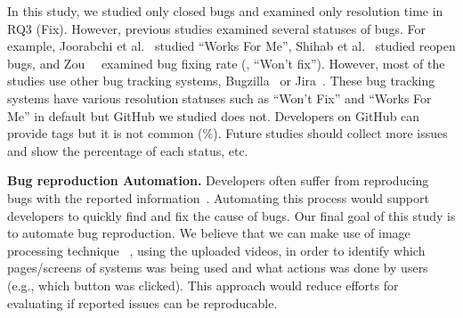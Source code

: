 In this study, we studied only closed bugs and examined only resolution time in RQ3 (Fix). However, previous studies examined several statuses of bugs. For example, Joorabchi et al.~\citep{DBLP:conf/msr/JoorabchiMM14} studied ``Works For Me'', Shihab et al.~\citep{DBLP:journals/ese/ShihabIKIOAHM13} studied reopen bugs, and Zou~\et~\citep{DBLP:conf/compsac/ZouXZCL15} examined bug fixing rate (\eg, ``Won't fix''). However, most of the studies use other bug tracking systems, Bugzilla~\citep{Bugzilla} or Jira~\citep{JIRA}. These bug tracking systems have various resolution statuses such as ``Won't Fix'' and ``Works For Me''  in default but GitHub we studied does not. Developers on GitHub can provide tags but it is not common (\%). Future studies should collect more issues and show the percentage of each status, etc. 

\noindent
\textbf{Bug reproduction Automation.}
Developers often suffer from reproducing bugs with the reported information~\citep{DBLP:conf/sigsoft/ChaparroLZMPMBN17}\citep{DBLP:conf/icsm/0001KC20}\citep{zimmermann2010TSE}.
Automating this process would support developers to quickly find and fix the cause of bugs. 
Our final goal of this study is to automate bug reproduction. 
We believe that we can make use of image processing technique ~\citep{DBLP:conf/nips/KrizhevskySH12}, using the uploaded videos, in order to identify which pages/screens of systems was being used and what actions was done by users (e.g., which button was clicked). 
This approach would reduce efforts for evaluating if reported issues can be reproducable. 





